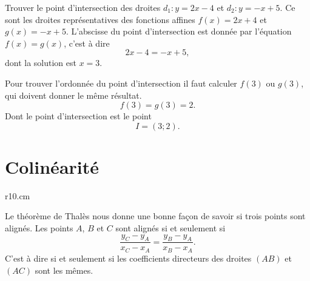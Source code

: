 \begin{example}
    Trouver le point d'intersection des droites \( d_1:y=2x-4\) et \( d_2:y=-x+5\). Ce sont les droites représentatives des fonctions affines \( f(x)=2x+4\) et \( g(x)=-x+5\). L'abscisse du point d'intersection est donnée par l'équation \( f(x)=g(x)\), c'est à dire
    \begin{equation}
        2x-4=-x+5,
    \end{equation}
    dont la solution est \( x=3\). 

    Pour trouver l'ordonnée du point d'intersection il faut calculer \( f(3)\) ou \( g(3)\), qui doivent donner le même résultat.
    \begin{equation}
        f(3)=g(3)=2.
    \end{equation}
    Dont le point d'intersection est le point
    \begin{equation}
        I=(3;2).
    \end{equation}
\end{example}

\section{Colinéarité}

\begin{wrapfigure}{r}{10.cm}
   \vspace{-0.5cm}        %
   \centering
   
\end{wrapfigure}


Le théorème de Thalès nous donne une bonne façon de savoir si trois points sont alignés. Les points \( A\), \( B\) et \( C\) sont alignés si et seulement si
\begin{equation}
    \frac{ y_C-y_A }{ x_C-x_A }=\frac{ y_B-y_A }{ x_B-x_A }.
\end{equation}
C'est à dire si et seulement si les coefficients directeurs des droites \( (AB)\) et \( (AC)\) sont les mêmes.
